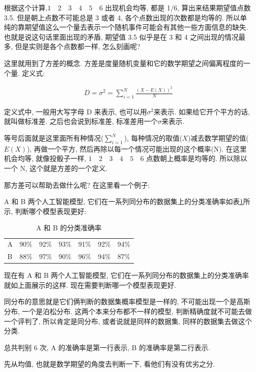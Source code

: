 根据这个计算,$1 \quad 2 \quad 3 \quad 4 \quad 5 \quad 6$ 出现机会均等, 都是 1/6, 算出来结果期望值点数 3.5. 但是朝上点数不可能总是 3 或者 4, 各个点数出现的次数都是均等的. 所以单纯的靠期望值这么一个量去表示一个随机事件可能会有其他一些方面信息的缺失. 也就是说这句话里面出现的矛盾, 期望值 3.5 似乎是在 3 和 4 之间出现的情况最多, 但是实则是各个点数都一样, 怎么刻画呢? 

这里就用到了方差的概念. 方差是度量随机变量和它的数学期望之间偏离程度的一个量. 定义式: 

\begin{align*}
  D = \sigma ^2 = \sum^N_{i=1} \frac{(X-E(X))^2}{N}
\end{align*}

定义式中, 一般用大写字母 D 来表示, 也可以用$\sigma^2$来表示. 如果给它开个平方的话, 就叫做标准差. 之后也会说到标准差, 标准差用一个$\sigma$来表示. 

等号后面就是这里面所有种情况($\sum_{i=1}^N$), 每种情况的取值($X$)减去数学期望的值($E(X)$), 再做一个平方, 然后再除以每一个情况可能出现的这个概率(N). 在这里机会均等, 就像投骰子一样, $1 \quad 2 \quad 3 \quad 4 \quad 5 \quad 6$ 点数朝上概率是均等的. 所以除以一个 N, 这个就是方差的一个定义. 

那方差可以帮助去做什么呢? 在这里看一个例子:

A 和 B 两个人工智能模型, 它们在一系列同分布的数据集上的分类准确率如表\ref{fig:table5_1}所示, 判断哪个模型表现更好:

\begin{table}[ht]
  \centering
  \begin{tabular}{lllllll}
  \midrule
    A & 90\% & 92\% & 93\% & 91\% & 92\% & 94\%\\
    B & 88\% & 97\% & 90\% & 96\% & 94\% & 87\%\\
  \bottomrule
  \end{tabular}
  \caption{A 和 B 的分类准确率}
  \label{fig:table5_1}
\end{table}

现在有 A 和 B 两个人工智能模型, 它们在一系列同分布的数据集上的分类准确率就如上面展示的这样. 现在需要判断哪一个模型表现更好. 

同分布的意思就是它们俩判断的数据集概率模型是一样的, 不可能出现一个是高斯分布, 一个是泊松分布. 这两个本来分布都不一样的模型, 判断精确度就不可能去做一个评判了, 所以肯定是同分布, 或者说就是同样的数据集, 同样的数据集去做这个分类. 

总共判别 6 次, A 的准确率是第一行表示, B 的准确率是第二行表示. 

先从均值, 也就是数学期望的角度去判断一下, 看他们有没有优劣之分. 

